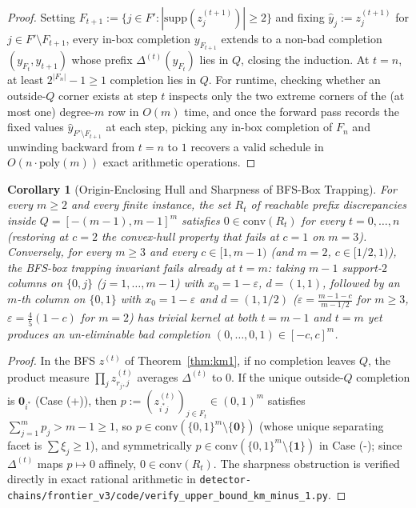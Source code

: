 \documentclass[11pt]{article}
\newtheorem{corollary}[theorem]{Corollary}
\theoremstyle{definition}
\newcommand{\disc}{\Delta}
\newcommand{\eps}{\varepsilon}
\begin{document}
\begin{proof}
Setting $F_{t+1}:=\{j\in F':|\mathrm{supp}(z_j^{(t+1)})|\ge 2\}$ and fixing $\hat{y}_j:=z_j^{(t+1)}$ for $j\in F'\setminus F_{t+1}$, every in-box completion $y_{F_{t+1}}$ extends to a non-bad completion $(y_{F_t},y_{t+1})$ whose prefix $\disc^{(t)}(y_{F_t})$ lies in $Q$, closing the induction. At $t=n$, at least $2^{|F_n|}-1\ge 1$ completion lies in $Q$. For runtime, checking whether an outside-$Q$ corner exists at step $t$ inspects only the two extreme corners of the (at most one) degree-$m$ row in $O(m)$ time, and once the forward pass records the fixed values $\hat{y}_{F'\setminus F_{t+1}}$ at each step, picking any in-box completion of $F_n$ and unwinding backward from $t=n$ to $1$ recovers a valid schedule in $O(n\cdot\mathrm{poly}(m))$ exact arithmetic operations.
\end{proof}

\begin{corollary}[Origin-Enclosing Hull and Sharpness of BFS-Box Trapping]\label{cor:hull}
For every $m\ge 2$ and every finite instance, the set $R_t$ of reachable prefix discrepancies inside $Q=[-(m-1),m-1]^m$ satisfies $0\in\mathrm{conv}(R_t)$ for every $t=0,\dots,n$ (restoring at $c=2$ the convex-hull property that fails at $c=1$ on $m=3$). Conversely, for every $m\ge 3$ and every $c\in[1,m-1)$ (and $m=2$, $c\in[1/2,1)$), the BFS-box trapping invariant fails already at $t=m$: taking $m-1$ support-$2$ columns on $\{0,j\}$ ($j=1,\dots,m-1$) with $x_0=1-\eps$, $d=(1,1)$, followed by an $m$-th column on $\{0,1\}$ with $x_0=1-\eps$ and $d=(1,1/2)$ ($\eps=\frac{m-1-c}{m-1/2}$ for $m\ge 3$, $\eps=\frac{4}{5}(1-c)$ for $m=2$) has trivial kernel at both $t=m-1$ and $t=m$ yet produces an un-eliminable bad completion $(0,\dots,0,1)\in[-c,c]^m$.
\end{corollary}
\begin{proof}
In the BFS $z^{(t)}$ of Theorem~\ref{thm:km1}, if no completion leaves $Q$, the product measure $\prod_j z_{r_j,j}^{(t)}$ averages $\disc^{(t)}$ to $0$. If the unique outside-$Q$ completion is $\mathbf{0}_{i^*}$ (Case (+)), then $p:=(z_{i^*j}^{(t)})_{j\in F_t}\in(0,1)^m$ satisfies $\sum_{j=1}^m p_j>m-1\ge 1$, so $p\in\mathrm{conv}(\{0,1\}^m\setminus\{\mathbf{0}\})$ (whose unique separating facet is $\sum\xi_j\ge 1$), and symmetrically $p\in\mathrm{conv}(\{0,1\}^m\setminus\{\mathbf{1}\})$ in Case (-); since $\disc^{(t)}$ maps $p\mapsto 0$ affinely, $0\in\mathrm{conv}(R_t)$. The sharpness obstruction is verified directly in exact rational arithmetic in \texttt{detector-chains/frontier\_v3/code/verify\_upper\_bound\_km\_minus\_1.py}.
\end{proof}
\end{document}
